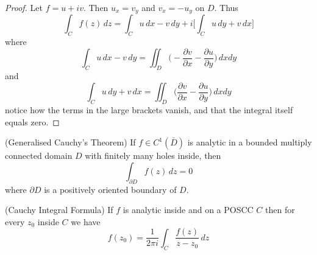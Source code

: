 \vspace{2ex}
\begin{proof}
Let $f=u+iv$. Then $u_{x}=v_{y}$ and $v_{x}=-u_{y}$ on $D$. Thus 
\[\int _{C}f(z)\,dz=\int _{C}u\,dx-v\,dy+i\Big[\int _{C}u\,dy+v\,dx\Big]\]
where 
\[\int _{C}u\,dx-v\,dy=\iint_{D}\Big(-\dfrac{\partial v}{\partial x}-\dfrac{\partial u}{\partial y}\Big)\,dxdy\]
and
\[\int _{C}u\,dy+v\,dx=\iint_{D}\Big(\dfrac{\partial v}{\partial x}-\dfrac{\partial u}{\partial y}\Big)\,dxdy\]
notice how the terms in the large brackets vanish, and that the integral itself equals zero.
\end{proof}
\vspace{2ex}
\begin{thm}
(Generalised Cauchy's Theorem) If $f\in C^{1}(\bar{D})$ is analytic in a bounded multiply connected domain $D$ with finitely many holes inside, then 
\[\int _{\partial D}f(z)\,dz=0\]
where $\partial D$ is a positively oriented boundary of $D$.
\end{thm}
\vspace{2ex}
\begin{thm}
(Cauchy Integral Formula) If $f$ is analytic inside and on a POSCC $C$ then for every $z_0$ inside $C$ we have 
\[f(z_0)=\dfrac{1}{2\pi i}\int _{C}\dfrac{f(z)}{z-z_0}\,dz\]

\end{thm}
\vspace{2ex}

